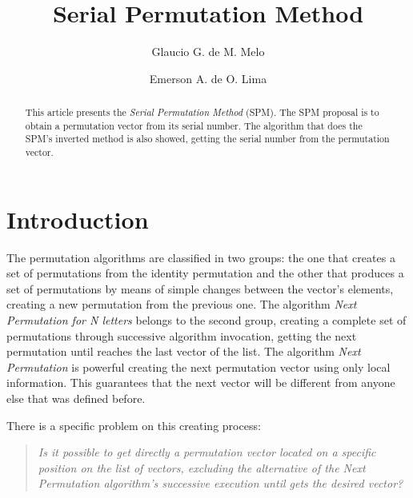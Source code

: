 \documentclass {amsart}
\newcommand{\emerson}{Emerson A. de O. Lima}
\newcommand{\glaucio}{Glaucio G. de M. Melo}
\begin{document}
\title[Serial Permutation Method]
 {Serial Permutation Method}
\author[Melo]{\glaucio}
\address[Melo]{Departamento de Estat\'{\i}stica e Inform\'{a}tica - UNICAP}
\author[Oliveira-Lima]{\emerson}
\address[Oliveira-Lima]{Departamento de Estat\'{\i}stica e Inform\'{a}tica - UNICAP}
\begin{abstract}
This article presents the \emph{Serial Permutation Method} (SPM).
The SPM proposal is to obtain a permutation vector from its serial
number. The algorithm that does the SPM's inverted method is also
showed, getting the serial number from the permutation vector. %
\end{abstract}
 \maketitle
\section*{Introduction}
The permutation algorithms are classified in two groups: the one
that creates a set of permutations from the identity permutation
and the other that produces a set of permutations by means of
simple changes between the vector's elements, creating a new
permutation from the previous one. The algorithm \emph{Next
Permutation for N letters} \cite{wi} belongs to the second group,
creating a complete set of permutations through successive
algorithm invocation, getting the next permutation until reaches
the last vector of the list. The algorithm \emph{Next Permutation}
is powerful creating the next permutation vector using only local
information. This guarantees that the next vector will be
different from anyone else that was defined before.

There is a specific problem on this creating process:
\begin{quote}
\emph{Is it possible to get directly a permutation vector located
on a specific position on the list of vectors, excluding the
alternative of the Next Permutation algorithm's successive
execution until gets the desired vector?}
\end{quote}
\end{document}
